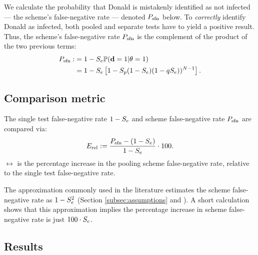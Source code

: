\documentclass{article}
\begin{document}
We calculate the probability that Donald is mistakenly identified as
not infected --- the scheme's false-negative rate --- denoted $P_{\text{sfn}}$
below. To \emph{correctly} identify Donald as infected, both pooled
and separate tests have to yield a positive result. Thus, the scheme's
false-negative rate $P_{\text{sfn}}$ is the complement of the product of the two
previous terms:
\begin{align}\label{eq:sfn}
    \begin{split}
        P_{\text{sfn}} :&= 1 - S_e\mathbb{P}(\mathbf{d}=1|\theta=1)\\
        &= 1 - S_e\left [1 - S_p(1-S_e)(1-qS_e))^{N-1}\right].
    \end{split}
\end{align}

\subsection{Comparison metric}
The single test false-negative rate $1-S_e$ and scheme false-negative
rate $P_{\text{sfn}}$ are compared via:
\begin{equation}\label{eq:erel}
E_{\text{rel}} := \frac{P_{\text{sfn}} - (1-S_e)}{1-S_e} \cdot 100.
\end{equation}
$\rel$ is the percentage increase in the pooling scheme false-negative
rate, relative to the single test false-negative rate.

The approximation commonly used in the literature estimates the scheme
false-negative rate as $1-S_e^2$ (Section \ref{subsec:assumptions} and
\cite{Simplistic1, Simplistic2, Kim, OptimalDorfmanPool}). A short
calculation shows that this approximation implies the percentage
increase in scheme false-negative rate is just $100\cdot S_e$.

\subsection{Results}\label{section:results}
\end{document}
